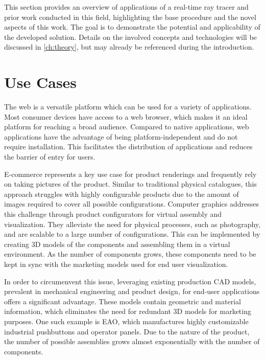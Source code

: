 
This section provides an overview of applications of a real-time ray tracer and prior work conducted in this field, highlighting the base procedure and the novel aspects of this work. The goal is to demonstrate the potential and applicability of the developed solution. Details on the involved concepts and technologies will be discussed in \autoref{ch:theory}, but may already be referenced during the introduction.

\section{Use Cases}

The web is a versatile platform which can be used for a variety of applications. Most consumer devices have access to a web browser, which makes it an ideal platform for reaching a broad audience. Compared to native applications, web applications have the advantage of being platform-independent and do not require installation. This facilitates the distribution of applications and reduces the barrier of entry for users.

E-commerce represents a key use case for product renderings and frequently rely on taking pictures of the product. Similar to traditional physical catalogues, this approach struggles with highly configurable products due to the amount of images required to cover all possible configurations. Computer graphics addresses this challenge through product configurators for virtual assembly and visualization. They alleviate the need for physical processes, such as photography, and are scalable to a large number of configurations. This can be implemented by creating 3D models of the components and assembling them in a virtual environment. As the number of components grows, these components need to be kept in sync with the marketing models used for end user visualization.

In order to circumenvent this issue, leveraging existing production \gls{CAD} models, prevalent in mechanical engineering and product design, for end-user applications offers a significant advantage. These models contain geometric and material information, which eliminates the need for redundant 3D models for marketing purposes. One such example is EAO, which manufactures highly customizable industrial pushbuttons and operator panels. Due to the nature of the product, the number of possible assemblies grows almost exponentially with the number of components.

